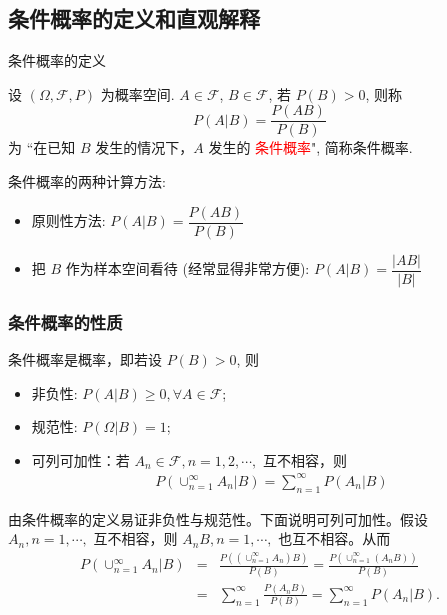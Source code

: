 \subsection{条件概率的定义和直观解释}%

\begin{frame}{条件概率的定义}
	\begin{defi}
		设 $(\Omega,\mathcal{F},P)$ 为概率空间. $A\in\mathcal{F}$, $B\in\mathcal{F}$, 若 $P (B)>0$, 则称 $$P (A|B)=\frac{P (AB)}{P (B)}$$ 为 ``在已知 $B$ 发生的情况下，$A$ 发生的 \textcolor{red}{条件概率}", 简称条件概率.
	\end{defi}
	\pause
	\vspace{0.4cm}
	\begin{rmk} 条件概率的两种计算方法:
		\begin{itemize}[<+-|alert@+>]
			\item 原则性方法: $P (A|B)=\dfrac{P (AB)}{P (B)}$
			\item 把 $B$ 作为样本空间看待 (经常显得非常方便): $P (A|B)=\dfrac{|AB|}{|B|}$
		\end{itemize}
	\end{rmk}
\end{frame}
\begin{frame}
	\frametitle{条件概率的性质}
	\begin{thm}
		条件概率是概率，即若设 $P (B)>0$, 则
		\begin{itemize}[<+-|alert@+>]
			\item 非负性: $P (A|B)\geq 0, \forall A\in\mathcal{F}$;
			\item 规范性: $P (\Omega|B)=1$;
			\item 可列可加性：若 $A_n\in \mathcal{F}, n=1,2,\cdots,$ 互不相容，则
			\begin{eqnarray*}
				P(\cup_{n=1}^\infty A_n|B)=\sum_{n=1}^\infty P(A_n|B)
			\end{eqnarray*}

		\end{itemize}
	\end{thm}

	\pause \zheng 由条件概率的定义易证非负性与规范性。下面说明可列可加性。假设 $A_n,n=1,\cdots,$ 互不相容，则 $A_nB, n=1,\cdots,$ 也互不相容。从而
	\begin{eqnarray*}
		P(\cup_{n=1}^\infty A_n|B)&=&\frac{P((\cup_{n=1}^\infty A_n)B)}{P(B)}=\frac{P(\cup_{n=1}^\infty (A_nB))}{P(B)}\\
		&=&\sum_{n=1}^\infty \frac{P(A_nB)}{P(B)}=\sum_{n=1}^\infty P(A_n|B).
	\end{eqnarray*}
\end{frame}


